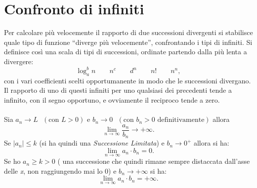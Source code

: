 \documentclass[a4paper,12pt, oneside]{book}
\begin{document}
\section{Confronto di infiniti}
Per calcolare più velocemente il rapporto di due successioni divergenti si stabilisce quale tipo di funzione ``diverge più velocemente'', confrontando i tipi di infiniti. Si definisce così una scala di tipi di successioni, ordinate partendo dalla più lenta a divergere:
$$\log_a^b n\qquad n^c\qquad d^n\qquad n!\qquad n^n,$$
con i vari coefficienti scelti opportumanente in modo che le successioni divergano. Il rapporto di uno di questi infiniti per uno qualsiasi dei precedenti tende a infinito, con il segno opportuno, e ovviamente il reciproco tende a zero.\\\\
Sia $a_n \rightarrow L \mbox{ }(\mbox{con } L>0) \mbox { e } b_n \rightarrow 0 \mbox{ }(\mbox{con } b_n>0 \mbox{ definitivamente})$ allora $$\lim_{n\rightarrow \infty}\frac{a_n}{b_n}\rightarrow +\infty.$$Se $|a_n|\leq k$ (si ha quindi una \textit{Successione Limitata}) e $b_n \rightarrow 0^{+}$ allora si ha: $$\lim_{n \rightarrow \infty} a_n\cdot b_n=0.$$
Se ho $a_n\geq k>0$ ( una successione che quindi rimane sempre distaccata dall'asse delle \textit{x}, non raggiungendo mai lo 0) e $b_n\rightarrow +\infty$ si ha: $$\lim_{n \rightarrow \infty} a_n\cdot b_n=+\infty.$$
\end{document}
